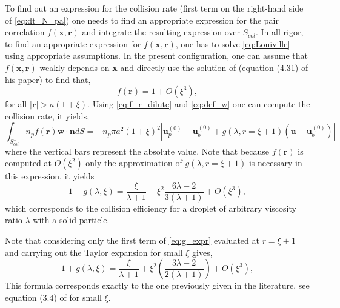 To find out an expression for the collision rate (first term on the right-hand side of \eqref{eq:dt_N_pa}) one needs to find an appropriate expression for the pair correlation $f(\textbf{x},\textbf{r})$ and integrate the resulting expression over $S_{col}^-$.
In all rigor, to find an appropriate expression for $f(\textbf{x},\textbf{r})$, one has to solve \eqref{eq:Louiville} using appropriate assumptions.  
In the present configuration, one can assume that $f(\textbf{x},\textbf{r})$ weakly depends on \textbf{x} and directly use the solution of \citet{batchelor1972sedimentation} (equation (4.31) of his paper) to find that, 
\begin{equation}
    f(\textbf{r}) = 1  + O(\xi^3), 
    \label{eq:f_r_dilute}
\end{equation}
for all $|\textbf{r}| > a(1+\xi)$. 
Using \eqref{eq:f_r_dilute} and \eqref{eq:def_w} one can compute the collision rate, it yields, 
\begin{equation} 
    \int_{S_{col}^-} 
    n_p f(\textbf{r}) \textbf{w}\cdot \textbf{n} dS
    =
    - n_p \pi a^2(1+\xi)^2 
        \left|\textbf{u}_p^{(0)}  - \textbf{u}_b^{(0)} + g(\lambda,r=\xi+1) (\textbf{u} - \textbf{u}_b^{(0)})\right|
\end{equation} 
where the vertical bars represent the absolute value. 
Note that because $f(\textbf{r})$ is computed at $O(\xi^2)$ only the approximation of $g(\lambda,r=\xi+1)$ is necessary in this expression, it yields
\begin{equation}
    1+g(\lambda,\xi)
    =
    \frac{\xi}{\lambda + 1} + \xi^2  \frac{6\lambda - 2}{3(\lambda+1)}
    + O(\xi^3),
    \label{eq:final_Ec}
\end{equation}
which corresponds to the collision efficiency for a droplet of arbitrary viscosity ratio $\lambda$ with a solid particle. 

Note that considering only the first term of \eqref{eq:g_expr} evaluated at $r=\xi+1$ and carrying out the Taylor expansion for small $\xi$ gives, 
\begin{equation}
    1+ g(\lambda,\xi)
    =
    \frac{\xi}{\lambda+1}
    +\xi^2 \left(
        \frac{3\lambda-2}{2(\lambda+1)}
    \right)
    + O(\xi^3),
    \label{eq:Ec_without_Faxen}
\end{equation}
 This formula corresponds exactly to the one previously given in the literature, see equation (3.4)  of \citep{loewenberg1994flotation} for small $\xi$. %


